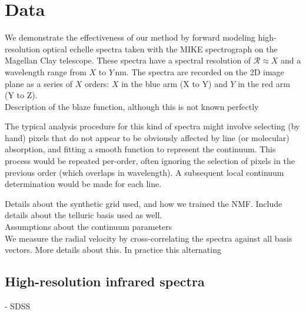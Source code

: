 \documentclass[modern]{aastex631}
\newcommand{\project}[1]{\textit{#1}}
\newcommand{\boss}{\project{BOSS}}
\newcommand{\todo}[1]{\textcolor{tab:red}{#1}}
\begin{document}
\section{Data}



We demonstrate the effectiveness of our method by forward modeling high-resolution optical echelle spectra taken with the MIKE spectrograph on the Magellan Clay telescope. These spectra have a spectral resolution of $\mathcal{R} \approx X$ and a wavelength range from $X$ to $Y$\,nm. The spectra are recorded on the 2D image plane as a series of $X$ orders: $X$ in the blue arm (X to Y) and $Y$ in the red arm (Y to Z). \\

\todo{Description of the blaze function, although this is not known perfectly}

The typical analysis procedure for this kind of spectra might involve selecting (by hand) pixels that do not appear to be obviously affected by line (or molecular) absorption, and fitting a smooth function to represent the continuum. This process would be repeated per-order, often ignoring the selection of pixels in the previous order (which overlaps in wavelength). A subsequent local continuum determination would be made for each line.

\todo{Details about the synthetic grid used, and how we trained the NMF. Include details about the telluric basis used as well.}\\

\todo{Assumptions about the continuum parameters}\\

We measure the radial velocity by cross-correlating the spectra against all basis vectors. \todo{More details about this.} In practice this alternating 


\subsection{High-resolution infrared spectra}
- SDSS
\end{document}
